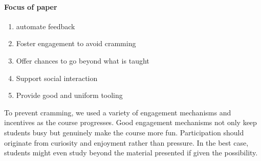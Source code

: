 \paragraph{Focus of paper}
\begin{enumerate}
\item automate feedback
\item Foster engagement to avoid cramming
\item Offer chances to go beyond what is taught
\item Support social interaction
\item Provide good and uniform tooling
\end{enumerate}

To prevent cramming,
we used a variety of engagement mechanisms and incentives as the course progresses.
Good engagement mechanisms not only keep students busy
but genuinely make the course more fun.
Participation should originate from curiosity and enjoyment rather than pressure.
In the best case, students might even study beyond the material presented
if given the possibility.

